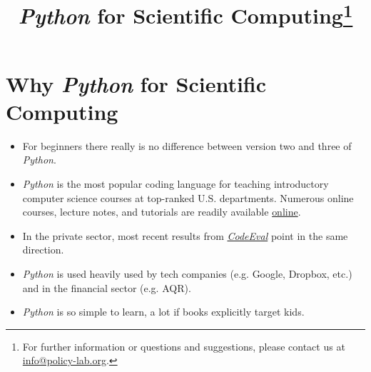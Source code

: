 
\title{\textit{Python} for Scientific Computing\thanks{For further information or questions and suggestions, please contact us at \href{mailto: info@policy-lab.org}{info@policy-lab.org}.}}
\author{ }
\date{ } 


\section{Why \textit{Python} for Scientific Computing}

\begin{itemize}
\item For beginners there really is no difference between version two and three of \textit{Python}.
\item \textit{Python} is the most popular coding language for teaching introductory computer science courses at top-ranked U.S. departments. Numerous online courses, lecture notes, and tutorials are readily available \href{http://www.fullstackpython.com/best-python-resources.html}{online}.
\item In the private sector, most recent results from \href{https://www.codeeval.com}{\textit{CodeEval}} point in the same direction.
\item \textit{Python} is used heavily used by tech companies (e.g. Google, Dropbox, etc.) and in the financial sector (e.g. AQR).
\item \textit{Python} is so simple to learn, a lot if books explicitly target kids. 
\end{itemize}


